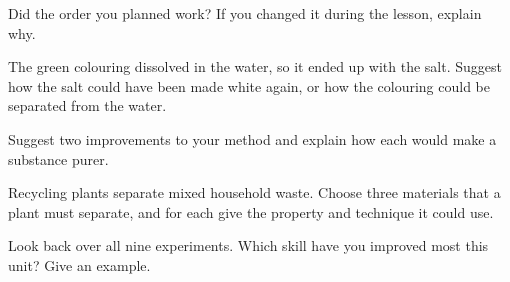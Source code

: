 \task Did the order you planned work? If you changed it during the lesson, explain why.
\answerbox{4cm}

\task The green colouring dissolved in the water, so it ended up with the salt. Suggest how the salt could have been made white again, or how the colouring could be separated from the water.
\answerbox{4cm}

\task Suggest two improvements to your method and explain how each would make a substance purer. 
\answerbox{5cm}

\begin{yr8box}
\begin{keepext}
\exttask Recycling plants separate mixed household waste. Choose three materials that a plant must separate, and for each give the property and technique it could use.
\answerbox{5cm}
\end{keepext}
\end{yr8box}


\begin{skillcheck}
\end{skillcheck}

\task Look back over all nine experiments. Which skill have you improved most this unit? Give an example.
\answerbox{5cm}


